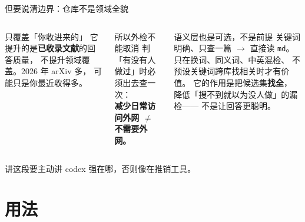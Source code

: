 \begin{frame}{但要说清边界：仓库不是领域全貌}
  \vspace{-2pt}
  \begin{columns}[T]
    \footnotesize
    \begin{alertblock}{只覆盖「你收进来的」}
      \scriptsize
      它提升的是\textbf{已收录文献}的回答质量，
      不提升领域覆盖。2026 年 arXiv 多，
      可能只是你最近收得多。
    \end{alertblock}

    \begin{block}{所以外检不能取消}
      \scriptsize
      判「有没有人做过」时必须出去查一次：\\
      \textbf{减少日常访问外网 $\neq$ 不需要外网。}
    \end{block}

    \footnotesize
    \begin{block}{语义层也是可选，不是前提}
      \scriptsize
      关键词明确、只查一篇 $\to$ 直接读 \texttt{md}。\\
      只在换词、同义词、中英混检、
      不预设关键词跨库找相关时才有价值。
      \vspace{0.4em}
      它的作用是把候选集\textbf{找全}，
      降低「搜不到就以为没人做」的漏检——
      \alert{不是让回答更聪明}。
    \end{block}
  \end{columns}

  \vspace{0.5em}
  {\footnotesize 讲这段要主动讲 codex 强在哪，否则像在推销工具。}
\end{frame}

\section{用法}

